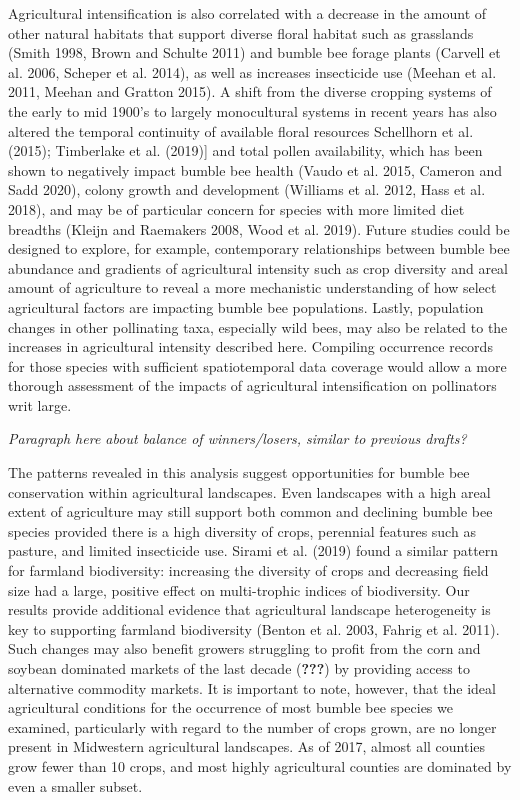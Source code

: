 \documentclass[11pt,]{article}
\begin{document}
Agricultural intensification is also correlated with a decrease in the
amount of other natural habitats that support diverse floral habitat
such as grasslands (Smith 1998, Brown and Schulte 2011) and bumble bee
forage plants (Carvell et al. 2006, Scheper et al. 2014), as well as
increases insecticide use (Meehan et al. 2011, Meehan and Gratton 2015).
A shift from the diverse cropping systems of the early to mid 1900's to
largely monocultural systems in recent years has also altered the
temporal continuity of available floral resources Schellhorn et al.
(2015); Timberlake et al. (2019){]} and total pollen availability, which
has been shown to negatively impact bumble bee health (Vaudo et al.
2015, Cameron and Sadd 2020), colony growth and development (Williams et
al. 2012, Hass et al. 2018), and may be of particular concern for
species with more limited diet breadths (Kleijn and Raemakers 2008, Wood
et al. 2019). Future studies could be designed to explore, for example,
contemporary relationships between bumble bee abundance and gradients of
agricultural intensity such as crop diversity and areal amount of
agriculture to reveal a more mechanistic understanding of how select
agricultural factors are impacting bumble bee populations. Lastly,
population changes in other pollinating taxa, especially wild bees, may
also be related to the increases in agricultural intensity described
here. Compiling occurrence records for those species with sufficient
spatiotemporal data coverage would allow a more thorough assessment of
the impacts of agricultural intensification on pollinators writ large.

\emph{Paragraph here about balance of winners/losers, similar to
previous drafts?}

The patterns revealed in this analysis suggest opportunities for bumble
bee conservation within agricultural landscapes. Even landscapes with a
high areal extent of agriculture may still support both common and
declining bumble bee species provided there is a high diversity of
crops, perennial features such as pasture, and limited insecticide use.
Sirami et al. (2019) found a similar pattern for farmland biodiversity:
increasing the diversity of crops and decreasing field size had a large,
positive effect on multi-trophic indices of biodiversity. Our results
provide additional evidence that agricultural landscape heterogeneity is
key to supporting farmland biodiversity (Benton et al. 2003, Fahrig et
al. 2011). Such changes may also benefit growers struggling to profit
from the corn and soybean dominated markets of the last decade
({\textbf{???}}) by providing access to alternative commodity markets.
It is important to note, however, that the ideal agricultural conditions
for the occurrence of most bumble bee species we examined, particularly
with regard to the number of crops grown, are no longer present in
Midwestern agricultural landscapes. As of 2017, almost all counties grow
fewer than 10 crops, and most highly agricultural counties are dominated
by even a smaller subset.
\end{document}
